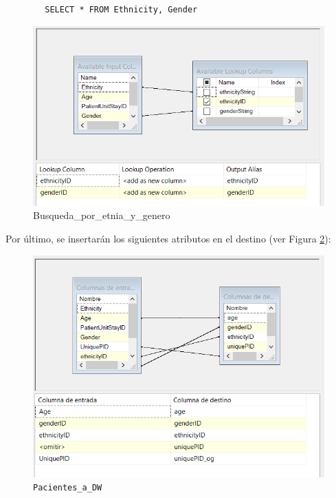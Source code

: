 \documentclass[12pt, a4paper, twoside]{article}
\begin{document}
	\begin{verbatim}
		SELECT * FROM Ethnicity, Gender
	\end{verbatim}
	
	
	\begin{figure}[h!]
		\centering
		\includegraphics[width=1\textwidth]{image/108_carga_paciente_lookup.png}
		\caption{Busqueda\_por\_etnia\_y\_genero}
		\label{fig:25}
	\end{figure}
	
	Por último, se insertarán los siguientes atributos en el destino (ver Figura \ref{fig:27}):
	
	\begin{figure}[h!]
		\centering
		\includegraphics[width=1\textwidth]{image/108_carga_paciente_destino.png}
		\caption{\texttt{Pacientes\_a\_DW}}
		\label{fig:27}
	\end{figure}
	
\end{document}
